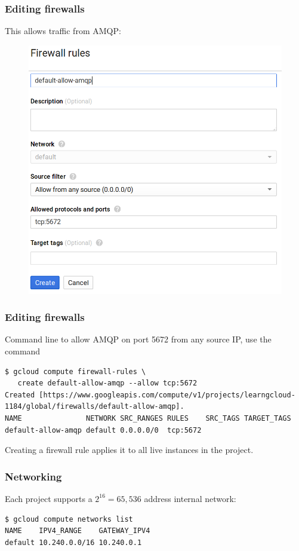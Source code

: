 \documentclass[9pt]{beamer}
\begin{document}
\begin{frame}[fragile]
  \frametitle{Editing firewalls}
  This allows traffic from AMQP:
  \begin{figure}
    \includegraphics[scale=0.2]{figures/DefineFirewall.png}
  \end{figure}
\end{frame}

\begin{frame}[fragile]
  \frametitle{Editing firewalls}
  Command line to allow AMQP on port 5672 from any source IP, use the command
\begin{verbatim}
$ gcloud compute firewall-rules \ 
   create default-allow-amqp --allow tcp:5672
Created [https://www.googleapis.com/compute/v1/projects/learngcloud-1184/global/firewalls/default-allow-amqp].
NAME               NETWORK SRC_RANGES RULES    SRC_TAGS TARGET_TAGS
default-allow-amqp default 0.0.0.0/0  tcp:5672
\end{verbatim}
  Creating a firewall rule applies it to all live instances in the project.
\end{frame}

\begin{frame}[fragile]
  \frametitle{Networking}
  Each project supports a $2^{16} = 65,536$ address internal network:
  \begin{verbatim}
$ gcloud compute networks list
NAME    IPV4_RANGE    GATEWAY_IPV4
default 10.240.0.0/16 10.240.0.1    
  \end{verbatim}
\end{frame}
\end{document}
